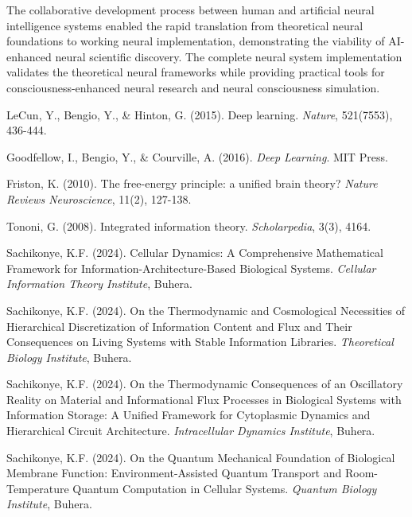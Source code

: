 \documentclass[12pt,a4paper]{article}
\theoremstyle{remark}
\begin{document}
The collaborative development process between human and artificial neural intelligence systems enabled the rapid translation from theoretical neural foundations to working neural implementation, demonstrating the viability of AI-enhanced neural scientific discovery. The complete neural system implementation validates the theoretical neural frameworks while providing practical tools for consciousness-enhanced neural research and neural consciousness simulation.


\begin{thebibliography}{99}

LeCun, Y., Bengio, Y., \& Hinton, G. (2015). Deep learning. \textit{Nature}, 521(7553), 436-444.

Goodfellow, I., Bengio, Y., \& Courville, A. (2016). \textit{Deep Learning}. MIT Press.

Friston, K. (2010). The free-energy principle: a unified brain theory? \textit{Nature Reviews Neuroscience}, 11(2), 127-138.

Tononi, G. (2008). Integrated information theory. \textit{Scholarpedia}, 3(3), 4164.

Sachikonye, K.F. (2024). Cellular Dynamics: A Comprehensive Mathematical Framework for Information-Architecture-Based Biological Systems. \textit{Cellular Information Theory Institute}, Buhera.

Sachikonye, K.F. (2024). On the Thermodynamic and Cosmological Necessities of Hierarchical Discretization of Information Content and Flux and Their Consequences on Living Systems with Stable Information Libraries. \textit{Theoretical Biology Institute}, Buhera.

Sachikonye, K.F. (2024). On the Thermodynamic Consequences of an Oscillatory Reality on Material and Informational Flux Processes in Biological Systems with Information Storage: A Unified Framework for Cytoplasmic Dynamics and Hierarchical Circuit Architecture. \textit{Intracellular Dynamics Institute}, Buhera.

Sachikonye, K.F. (2024). On the Quantum Mechanical Foundation of Biological Membrane Function: Environment-Assisted Quantum Transport and Room-Temperature Quantum Computation in Cellular Systems. \textit{Quantum Biology Institute}, Buhera.


\end{thebibliography}
\end{document}

